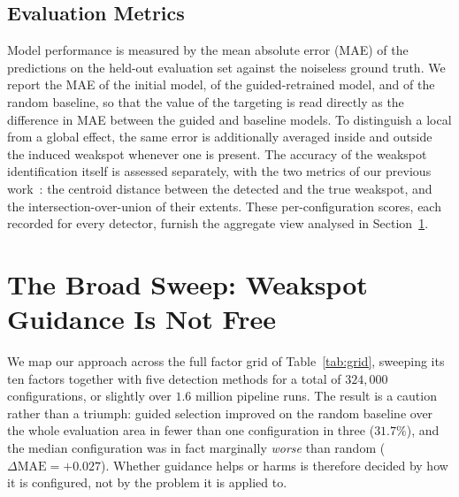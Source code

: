 \documentclass[conference]{IEEEtran}
\begin{document}
\subsection{Evaluation Metrics}
Model performance is measured by the mean absolute error (MAE) of the
predictions on the held-out evaluation set against the noiseless ground truth. We
report the MAE of the initial model, of the guided-retrained model, and of the
random baseline, so that the value of the targeting is read directly as the
difference in MAE between the guided and baseline models. To distinguish a local
from a global effect, the same error is additionally averaged inside and outside
the induced weakspot whenever one is present. The accuracy of the weakspot
identification itself is assessed separately, with the two metrics of our previous
work~\cite{weakspotprior}: the centroid distance between the detected and the true
weakspot, and the intersection-over-union of their extents. These per-configuration
scores, each recorded for every detector, furnish the aggregate view analysed in
Section~\ref{sec:broadsweep}.

\section{The Broad Sweep: Weakspot Guidance Is Not Free}
\label{sec:broadsweep}
We map our approach across the full factor grid of Table~\ref{tab:grid}, sweeping its ten
factors together with five detection methods for a total of $324{,}000$
configurations, or slightly over $1.6$ million pipeline runs. The result is a caution
rather than a triumph: guided selection improved on the random baseline over the whole
evaluation area in fewer than one configuration in three ($31.7\%$), and the median
configuration was in fact marginally \emph{worse} than random
($\Delta\mathrm{MAE}=+0.027$). Whether guidance helps or harms is therefore decided by
how it is configured, not by the problem it is applied to.
\end{document}
